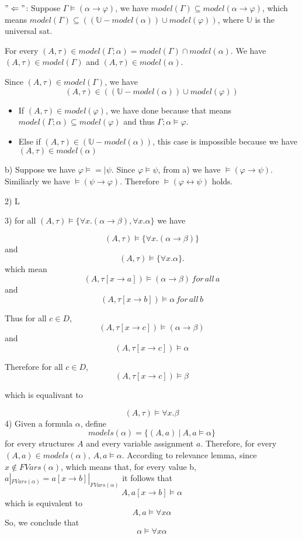 \documentclass[12pt]{article}
\newcommand{\logequiv}{{\models =\!\!\!|}}
\renewcommand{\phi}{\varphi}
\begin{document}
\begin{enumerate}
		
		$"\Leftarrow"$:
		Suppose $\Gamma\models(\alpha\to\phi)$,	
		we have $model(\Gamma)\subseteq model(\alpha\to\phi)$, which means $model(\Gamma)\subseteq ((\mathbb{U}-model(\alpha))\cup model(\phi))$, where $\mathbb{U}$ is the universal sat. 
		
		For every $(A,\tau)\in model(\Gamma;\alpha)=model(\Gamma)\cap model(\alpha)$. We have $(A,\tau)\in model(\Gamma)$ and $ (A,\tau)\in model(\alpha)$.
		
		Since $(A,\tau)\in model(\Gamma)$, we have 
		$$
		(A,\tau)\in ((\mathbb{U}-model(\alpha))\cup model(\phi))
		$$
		\begin{itemize}
			\item If  $(A,\tau)\in model(\phi)$, we have done because that means $model(\Gamma;\alpha)\subseteq model(\phi)$ and thus $\Gamma;\alpha\models \phi$.
			\item Else if $(A,\tau)\in (\mathbb{U}-model(\alpha))$, this case is impossible because we have $(A,\tau)\in model(\alpha)$
		\end{itemize}  
		
		b) Suppose we have $\phi \logequiv \psi$. Since $\phi\models \psi$, from a) we have $\models (\phi\to\psi)$. Similiarly we have $\models(\psi\to\phi)$. Therefore $\models(\phi\leftrightarrow\psi)$ holds.
		
		2) L
		
		3) for all 
		$
			(A,\tau)\models \{\forall x.(\alpha\to\beta),\forall x.\alpha\}
		$ we have
		
		$$(A,\tau)\models \{\forall x.(\alpha\to\beta)\}
		$$
		and
		$$(A,\tau)\models \{\forall x.\alpha\}.
		$$
		which mean
		$$(A,\tau[x\to a])\models (\alpha\to\beta) \,for\,all\,a
		$$
		and 
		$$(A,\tau[x\to b])\models \alpha \,for\,all\,b
		$$
		
		Thus for all $c\in D$,
		$$(A,\tau[x\to c])\models (\alpha\to\beta) 
		$$
		and 
		$$(A,\tau[x\to c])\models \alpha 
		$$
		
		Therefore for all $c\in D$,
		$$(A,\tau[x\to c])\models\beta$$
		
		which is equalivant to
		
		$$(A,\tau)\models\forall x.\beta$$
		4) Given a formula $\alpha$, define $$models(\alpha)=\{(A,a)\ |\ A,a\models\alpha\}$$ for every structures $A$ and every variable assignment $a$.\newline
		Therefore, for every $(A,a)\in models(\alpha)$, $A,a\models\alpha$.\newline
		According to relevance lemma, since $x\notin FVars(\alpha)$, which means that, for every value b, $a|_{FVars(\alpha)}=a[x\rightarrow b]|_{FVars(\alpha)}$ it follows that $$A,a[x\rightarrow b]\models\alpha$$ which is equivalent to $$A,a\models\forall x\alpha$$
		So, we conclude that $$\alpha\models\forall x\alpha$$
		

\end{enumerate}
\end{document}

